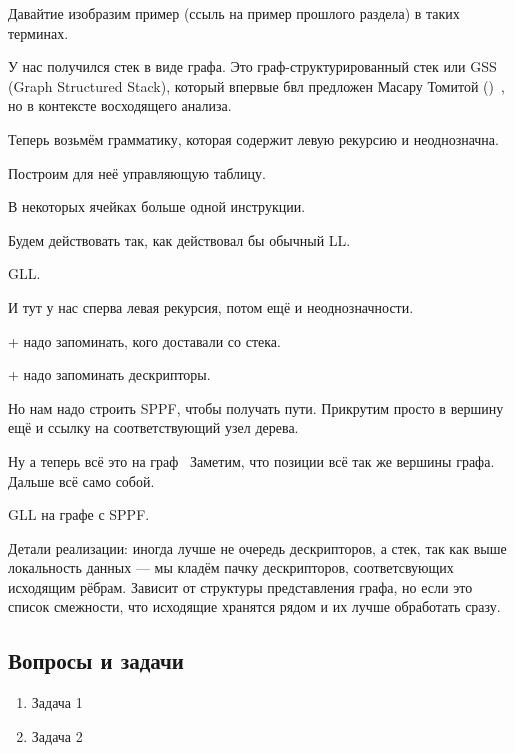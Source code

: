 Давайтие изобразим пример (ссыль на пример прошлого раздела) в таких терминах.
\begin{example}
\end{example}

У нас получился стек в виде графа. Это граф-структурированный стек или GSS (Graph Structured Stack), который впервые бвл предложен Масару Томитой ()~\cite{!!!}, но в контексте восходящего анализа.



Теперь возьмём грамматику, которая содержит левую рекурсию и неоднозначна.

Построим для неё управляющую таблицу.


В некоторых ячейках больше одной инструкции.

Будем действовать так, как действовал бы обычный LL.

\begin{example} GLL.

  И тут у нас сперва левая рекурсия, потом ещё и неоднозначности.

  + надо запоминать, кого доставали со стека.

  + надо запоминать дескрипторы.

\end{example}


Но нам надо строить SPPF, чтобы получать пути.
Прикрутим просто в вершину ещё и ссылку на соответствующий узел дерева.

Ну а теперь всё это на граф~\cite{Grigorev:2017:CPQ:3166094.3166104}
Заметим, что позиции всё так же вершины графа.
Дальше всё само собой.

\begin{example} GLL на графе с SPPF.
\end{example}


Детали реализации: иногда лучше не очередь дескрипторов, а стек, так как выше локальность данных --- мы кладём пачку дескрипторов, соответсвующих исходящим рёбрам. Зависит от структуры представления графа, но если это список смежности, что исходящие хранятся рядом и их лучше обработать сразу.

\subsection{Вопросы и задачи}
\begin{enumerate}
  \item Задача 1
  \item Задача 2
\end{enumerate}

